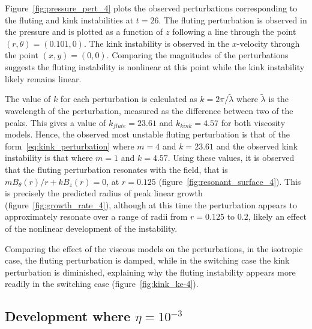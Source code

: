 Figure~\ref{fig:pressure_pert_4} plots the observed perturbations corresponding to the fluting and kink instabilities at $t=26$. The fluting perturbation is observed in the pressure and is plotted as a function of $z$ following a line through the point $(r, \theta) = (0.101, 0)$. The kink instability is observed in the $x$-velocity through the point $(x, y) = (0,0)$. Comparing the magnitudes of the perturbations suggests the fluting instability is nonlinear at this point while the kink instability likely remains linear.

The value of $k$ for each perturbation is calculated as $k = 2\pi/\tilde{\lambda}$ where $\tilde{\lambda}$ is the wavelength of the perturbation, measured as the difference between two of the peaks. This gives a value of $k_{flute}=23.61$ and $k_{kink}=4.57$ for both viscosity models. Hence, the observed most unstable fluting perturbation is that of the form~\ref{eq:kink_perturbation} where $m=4$ and $k=23.61$ and the observed kink instability is that where $m=1$ and $k=4.57$. Using these values, it is observed that the fluting perturbation resonates with the field, that is $m B_{\theta}(r)/r + kB_z(r) = 0$, at $r=0.125$ (figure~\ref{fig:resonant_surface_4}). This is precisely the predicted radius of peak linear growth (figure~\ref{fig:growth_rate_4}), although at this time the perturbation appears to approximately resonate over a range of radii from $r=0.125$ to $0.2$, likely an effect of the nonlinear development of the instability.

Comparing the effect of the viscous models on the perturbations, in the isotropic case, the fluting perturbation is damped, while in the switching case the kink perturbation is diminished, explaining why the fluting instability appears more readily in the switching case (figure~\ref{fig:kink_ke-4}).

\subsection{Development where $\eta=10^{-3}$}

